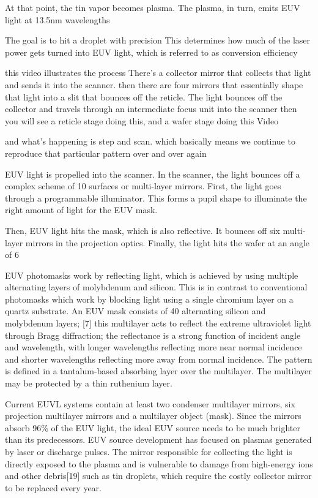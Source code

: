 \documentclass[12pt,a4paper]{report}
\begin{document}
At that point, the tin vapor becomes plasma. 
The plasma, in turn, emits EUV light at 13.5nm 
wavelengths

The goal is to hit a droplet with precision
This determines how much of the laser power 
gets turned into EUV light, 
which is referred to as conversion efficiency

this {video illustrates the process}
There's a collector mirror that collects that light
and sends it into the scanner. then there are 
four mirrors that essentially shape that light 
into a slit that
bounces off the reticle.
The light bounces off the collector and travels 
through an intermediate focus unit into the scanner
then you will see a reticle stage doing this, 
and a wafer stage doing this {Video}

and what's  happening is step and scan. which 
basically means we continue to reproduce that 
particular pattern
over and over again

EUV light is propelled into the scanner. In the 
scanner, the light bounces off a complex scheme 
of 10 surfaces or multi-layer mirrors. First, 
the light goes through a programmable illuminator. 
This forms 
a pupil shape to illuminate the right amount of 
light for the EUV mask.

Then, EUV light hits the mask, which is also 
reflective. It bounces off six multi-layer 
mirrors in the
projection optics. Finally, the light hits 
the wafer at an angle of 6%

EUV photomasks work by reflecting light, which is 
achieved by using multiple alternating layers of 
molybdenum and silicon. 
This is in contrast to conventional photomasks 
which work by blocking light using a single 
chromium layer on a quartz substrate. An EUV mask 
consists of 40 alternating silicon and molybdenum 
layers;
[7] this multilayer acts to reflect the extreme 
ultraviolet light through Bragg diffraction; 
the reflectance is a strong function of incident 
angle and wavelength, with longer wavelengths 
reflecting more near normal incidence and shorter 
wavelengths reflecting more away from normal incidence. 
The pattern is defined in a tantalum-based 
absorbing layer over the multilayer.
 The multilayer 
may be protected by a thin ruthenium layer.


Current EUVL systems contain at least two 
condenser multilayer mirrors, six projection multilayer 
mirrors and a multilayer object (mask). Since 
the mirrors absorb 96\% of the EUV light, the ideal 
EUV source needs to be much brighter than its 
predecessors. EUV source development has focused on 
plasmas generated by laser or discharge pulses. 
The mirror responsible for collecting the light is 
directly exposed to the plasma and is vulnerable 
to damage from high-energy ions and other 
debris[19] such as tin droplets, which require 
the costly collector mirror to be replaced every year.
\end{document}
